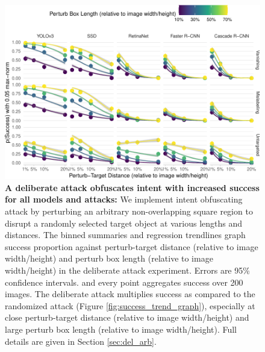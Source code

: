 \begin{figure}[tb]

{\centering \includegraphics[width=1\linewidth]{rmd_imgs/arbitrary_trend_graph_normed} 

}

\caption{\textbf{A deliberate attack obfuscates intent with increased success for all models and attacks:}  We implement intent obfuscating attack by perturbing an arbitrary non-overlapping square region to disrupt a randomly selected target object at various lengths and distances. The binned summaries and regression trendlines graph success proportion against perturb-target distance (relative to image width/height) and perturb box length (relative to image width/height) in the deliberate attack experiment. Errors are 95\% confidence intervals.  and every point aggregates success over 200 images. The deliberate attack multiplies success as compared to the randomized attack (Figure \ref{fig:success_trend_graph}), especially at close perturb-target distance (relative to image width/height) and large perturb box length (relative to image width/height). Full details are given in Section \ref{sec:del_arb}.}\label{fig:arbitrary_trend_graph_normed}
\end{figure}

